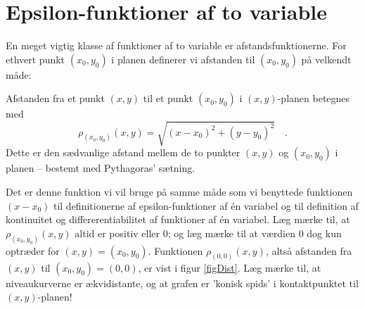 \section{Epsilon-funktioner af to variable} \label{Epsilon}

En meget vigtig klasse af  funktioner af to variable er afstandsfunktionerne. For ethvert punkt $(x_{0}, y_{0})$ i planen definerer vi afstanden til $(x_{0}, y_{0})$ på velkendt måde:

\begin{definition}[Afstandsfunktioner]
Afstanden fra et punkt $(x,y)$ til et punkt $(x_{0}, y_{0})$ i $(x,y)$-planen
betegnes med
\begin{equation}
\rho_{(x_{0}, y_{0})}(x,y) = \sqrt{(x-x_{0})^{2} + (y-y_{0})^{2}} \quad.
\end{equation}
Dette er den sædvanlige afstand mellem de to punkter $(x,y)$ og $(x_{0}, y_{0})$ i planen --
bestemt med Pythagoras' sætning.
\end{definition}

\begin{aha}
Det er denne funktion vi vil bruge på samme måde som vi benyttede funktionen  $(x-x_{0})$ til definitionerne af
epsilon-funktioner af \'{e}n variabel og til definition af kontinuitet og differerentiabilitet af funktioner af \'{e}n variabel.
Læg mærke til, at $\rho_{(x_{0}, y_{0})}(x,y)$ altid er positiv eller $0$; og læg mærke til at værdien $0$ dog kun optræder for $(x, y) = (x_{0}, y_{0})$.
Funktionen $\rho_{(0,0)}(x,y)$, altså afstanden fra $(x,y)$ til $(x_{0}, y_{0}) = (0,0)$, er vist i figur \ref{figDist}. Læg mærke til, at niveaukurverne er ækvidistante, og at grafen er 'konisk spids' i kontaktpunktet til $(x,y)$-planen!
\end{aha}

